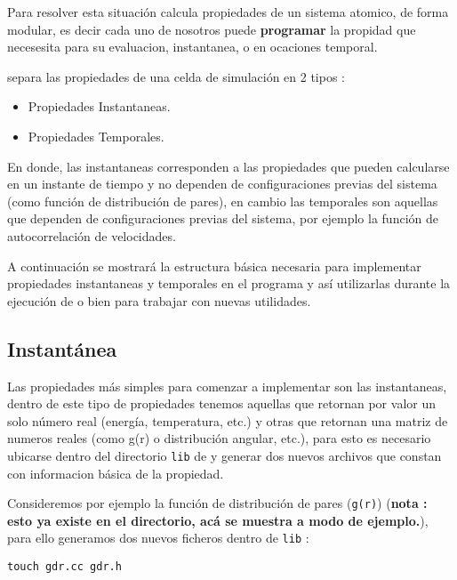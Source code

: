Para resolver esta situaci\'on \lpmd calcula propiedades de un sistema atomico, de forma modular, es decir cada uno de nosotros puede \textbf{programar} la propidad que necesesita para su evaluacion, instantanea, o en ocaciones temporal.

\lpmd separa las propiedades de una celda de simulaci\'on en 2 tipos :

\begin{itemize}
 \item Propiedades Instantaneas.
 \item Propiedades Temporales.
\end{itemize}

En donde, las instantaneas corresponden a las propiedades que pueden calcularse en un instante de tiempo y no dependen de configuraciones previas del sistema (como funci\'on de distribuci\'on de pares), en cambio las temporales son aquellas que dependen de configuraciones previas del sistema, por ejemplo la funci\'on de autocorrelaci\'on de velocidades.

A continuaci\'on se mostrar\'a la estructura b\'asica necesaria para implementar propiedades instantaneas y temporales en el programa \lpmd y as\'i utilizarlas durante la ejecuci\'on de \lpmd o bien para trabajar con nuevas utilidades.

\subsection{Instant\'anea}

Las propiedades m\'as simples para comenzar a implementar son las instantaneas, dentro de este tipo de propiedades tenemos aquellas que retornan por valor un solo n\'umero real (energ\'ia, temperatura, etc.) y otras que retornan una matriz de numeros reales (como g(r) o distribuci\'on angular, etc.), para esto es necesario ubicarse dentro del directorio \verb|lib| de \lpmd y generar dos nuevos archivos que constan con informacion b\'asica de la propiedad.

Consideremos por ejemplo la funci\'on de distribuci\'on de pares (\verb|g(r)|) (\textbf{nota : esto ya existe en el directorio, ac\'a se muestra a modo de ejemplo.}), para ello generamos dos nuevos ficheros dentro de \verb|lib| :

\begin{center}
 \verb|touch gdr.cc gdr.h|
\end{center}

